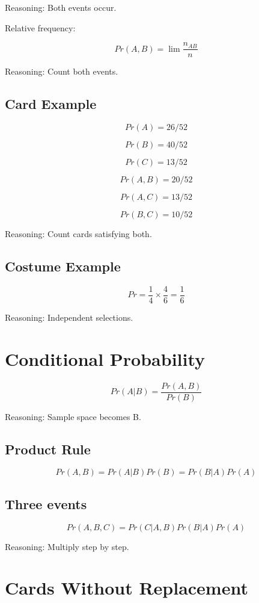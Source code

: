 \documentclass[12pt]{article}
\begin{document}
Reasoning: Both events occur.

\bigskip

Relative frequency:

\[
Pr(A,B)
=
\lim
\frac{n_{AB}}{n}
\]

Reasoning: Count both events.

\subsection{Card Example}

\[
Pr(A)=26/52
\]

\[
Pr(B)=40/52
\]

\[
Pr(C)=13/52
\]

\[
Pr(A,B)=20/52
\]

\[
Pr(A,C)=13/52
\]

\[
Pr(B,C)=10/52
\]

Reasoning: Count cards satisfying both.

\subsection{Costume Example}

\[
Pr = \frac{1}{4} \times \frac{4}{6} = \frac{1}{6}
\]

Reasoning: Independent selections.

\section{Conditional Probability}

\[
Pr(A|B)
=
\frac{Pr(A,B)}{Pr(B)}
\]

Reasoning: Sample space becomes B.

\subsection{Product Rule}

\[
Pr(A,B)
=
Pr(A|B)Pr(B)
=
Pr(B|A)Pr(A)
\]

\subsection{Three events}

\[
Pr(A,B,C)
=
Pr(C|A,B)
Pr(B|A)
Pr(A)
\]

Reasoning: Multiply step by step.

\section{Cards Without Replacement}
\end{document}
